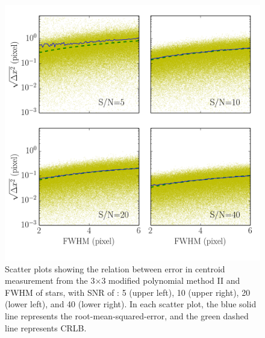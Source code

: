 \documentclass[12pt, preprint]{aastex}
\begin{document}
\begin{figure}[!htb]
  \includegraphics[width=\linewidth]{fwhm_psfpoly.png}
\endminipage
\caption{Scatter plots showing the relation between error in centroid measurement
from the 3$\times$3 modified polynomial method II and FWHM of stars, with SNR  of : 5 (upper left),
10 (upper right), 20 (lower left), and 40 (lower right). In each scatter plot, the blue solid
 line represents the root-mean-squared-error, and the green dashed line represents CRLB.}\label{8}
\end{figure}
\end{document}
